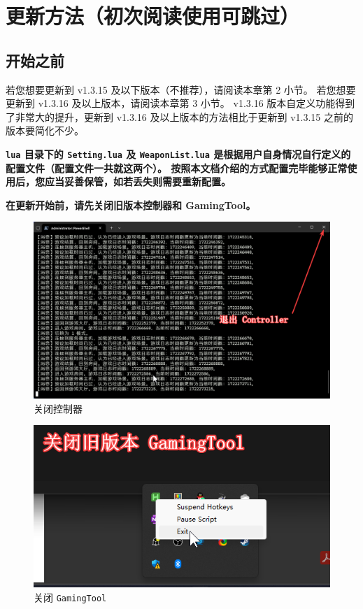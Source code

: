 \section{更新方法（初次阅读使用可跳过）}

\subsection{开始之前}

若您想要更新到 v1.3.15 及以下版本（不推荐），请阅读本章第 2 小节。
若您想要更新到 v1.3.16 及以上版本，请阅读本章第 3 小节。
v1.3.16 版本自定义功能得到了非常大的提升，更新到 v1.3.16 及以上版本的方法相比于更新到 v1.3.15 之前的版本要简化不少。

\textbf{\color{red}\lstinline{lua} 目录下的 \lstinline{Setting.lua} 及 \lstinline{WeaponList.lua} 是根据用户自身情况自行定义的配置文件（配置文件一共就这两个）。
按照本文档介绍的方式配置完毕能够正常使用后，您应当妥善保管，如若丢失则需要重新配置。}

\textbf{\color{red}在更新开始前，请先关闭旧版本控制器和 GamingTool。}

\begin{figure}[H]
    \Centering
    \includegraphics[width=\textwidth]{docs/assets/update/close_controller.png}
    \caption{关闭控制器}
\end{figure}


\begin{figure}[H]
    \Centering
    \includegraphics[width=\textwidth]{docs/assets/update/close_gamingtool.png}
    \caption{关闭 \lstinline{GamingTool}}
\end{figure}

